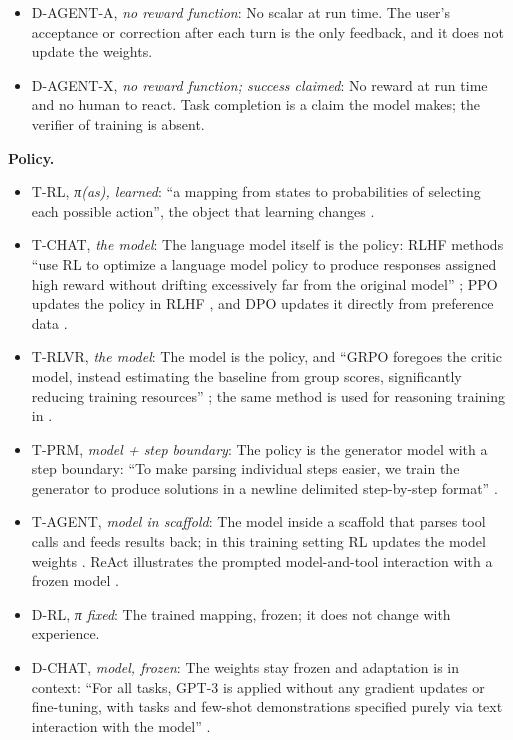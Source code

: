 \documentclass{article}
\providecommand{\tightlist}{\setlength{\itemsep}{0pt}\setlength{\parskip}{0pt}}
\begin{document}
\begin{itemize}
\item
  D-AGENT-A, \emph{no reward function}: No scalar at run time. The user's acceptance or correction after each turn is the only feedback, and it does not update the weights.
\item
  D-AGENT-X, \emph{no reward function; success claimed}: No reward at run time and no human to react. Task completion is a claim the model makes; the verifier of training is absent.
\end{itemize}

\textbf{Policy.}

\begin{itemize}
\tightlist
\item
  T-RL, \emph{π(a\textbar s), learned}: ``a mapping from states to probabilities of selecting each possible action'', the object that learning changes \citep{sutton2018}.
\item
  T-CHAT, \emph{the model}: The language model itself is the policy: RLHF methods ``use RL to optimize a language model policy to produce responses assigned high reward without drifting excessively far from the original model'' \citep{rafailov2023}; PPO updates the policy in RLHF \citep{ouyang2022}, and DPO updates it directly from preference data \citep{rafailov2023}.
\item
  T-RLVR, \emph{the model}: The model is the policy, and ``GRPO foregoes the critic model, instead estimating the baseline from group scores, significantly reducing training resources'' \citep{shao2024}; the same method is used for reasoning training in \citep{deepseekai2025}.
\item
  T-PRM, \emph{model + step boundary}: The policy is the generator model with a step boundary: ``To make parsing individual steps easier, we train the generator to produce solutions in a newline delimited step-by-step format'' \citep{lightman2024}.
\item
  T-AGENT, \emph{model in scaffold}: The model inside a scaffold that parses tool calls and feeds results back; in this training setting RL updates the model weights \citep{zhou2024b}. ReAct illustrates the prompted model-and-tool interaction with a frozen model \citep{yao2023b}.
\item
  D-RL, \emph{π fixed}: The trained mapping, frozen; it does not change with experience.
\item
  D-CHAT, \emph{model, frozen}: The weights stay frozen and adaptation is in context: ``For all tasks, GPT-3 is applied without any gradient updates or fine-tuning, with tasks and few-shot demonstrations specified purely via text interaction with the model'' \citep{brown2020}.

\end{itemize}
\end{document}
